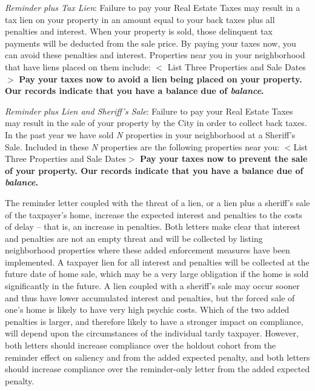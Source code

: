\documentclass[12pt]{article}
\begin{document}
\bigskip

\noindent \textit{Reminder plus Tax Lien}: Failure to pay your Real
Estate Taxes may result in a tax lien on your property in an amount
equal to your back taxes plus all penalties and interest.  When your
property is sold, those delinquent tax payments will be deducted from
the sale price.  By paying your taxes now, you can avoid these
penalties and interest.  Properties near you in your neighborhood that
have liens placed on them include: $<$ List Three Properties and Sale
Dates $>$ \textbf{Pay your taxes now to avoid a lien being placed on
  your property.  Our records indicate that you have a balance due of
  \textit{balance}.  }

\bigskip

\noindent \textit{Reminder plus Lien and Sheriff's Sale}: Failure to
pay your Real Estate Taxes may result in the sale of your property by
the City in order to collect back taxes.  In the past year we have
sold \textit{N} properties in your neighborhood at a Sheriff's Sale.
Included in these \textit{N} properties are the following properties
near you: $<$List Three Properties and Sale Dates$>$ \textbf{Pay your
  taxes now to prevent the sale of your property.  Our records
  indicate that you have a balance due of \textit{balance}.}

\bigskip

The reminder letter coupled with the threat of a lien, or a lien plus
a sheriff's sale of the taxpayer's home, increase the expected
interest and penalties to the costs of delay -- that is, an increase
in penalties.  Both letters make clear that interest and
penalties are not an empty threat and will be collected by listing
neighborhood properties where these added enforcement measures have
been implemented.  A taxpayer lien for all interest and penalties will
be collected at the future date of home sale, which may be a very
large obligation if the home is sold significantly in the future.  A
lien coupled with a sheriff's sale may occur sooner and thus have
lower accumulated interest and penalties, but the forced sale of one's
home is likely to have very high psychic costs.  Which of the two
added penalties is larger, and therefore likely to have a stronger
impact on compliance, will depend upon the circumstances of the
individual tardy taxpayer.  However, both letters should increase
compliance over the holdout cohort from the reminder effect on
saliency and from the added expected penalty, and both letters should
increase compliance over the reminder-only letter from the added
expected penalty.
\end{document}
